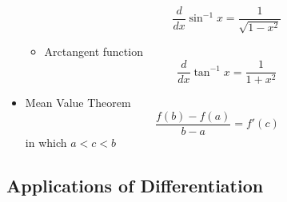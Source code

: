\begin{itemize}
\begin{itemize}
					\begin{equation}
						\dfrac{d}{dx} \sin^{-1} x = \frac{1}{\sqrt{1-x^2}}
					\end{equation}
				\item Arctangent function
					\begin{equation}
						\dfrac{d}{dx} \tan^{-1} x = \frac{1}{1+x^2}
					\end{equation}
			\end{itemize}
		\item Mean Value Theorem
			\begin{equation}
				\frac{f(b) - f(a)}{b-a} = f'(c)
			\end{equation}
			in which $a < c < b$
	\end{itemize}
\subsection{Applications of Differentiation}
